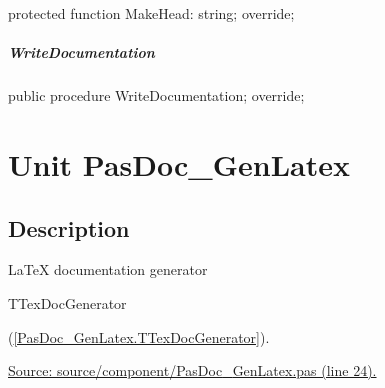 \documentclass{report}
\newif\ifpdf
\begin{document}
\label{PasDoc_GenHtmlHelp.THTMLHelpDocGenerator-MakeHead}
\begin{list}{}{
\setlength{\itemindent}{0cm}
\setlength{\listparindent}{0cm}
\setlength{\leftmargin}{\evensidemargin}
\addtolength{\leftmargin}{\tmplength}
\settowidth{\labelsep}{X}
\addtolength{\leftmargin}{\labelsep}
\setlength{\labelwidth}{\tmplength}
}
\item[\textbf{Declaration}\hfill]
\ifpdf
\begin{flushleft}
\fi
\begin{ttfamily}
protected function MakeHead: string; override;\end{ttfamily}

\ifpdf
\end{flushleft}
\fi

\end{list}
\paragraph*{WriteDocumentation}\hspace*{\fill}

\label{PasDoc_GenHtmlHelp.THTMLHelpDocGenerator-WriteDocumentation}
\begin{list}{}{
\setlength{\itemindent}{0cm}
\setlength{\listparindent}{0cm}
\setlength{\leftmargin}{\evensidemargin}
\addtolength{\leftmargin}{\tmplength}
\settowidth{\labelsep}{X}
\addtolength{\leftmargin}{\labelsep}
\setlength{\labelwidth}{\tmplength}
}
\item[\textbf{Declaration}\hfill]
\ifpdf
\begin{flushleft}
\fi
\begin{ttfamily}
public procedure WriteDocumentation; override;\end{ttfamily}

\ifpdf
\end{flushleft}
\fi

\end{list}
\chapter{Unit PasDoc{\_}GenLatex}
\label{PasDoc_GenLatex}
\section{Description}
LaTeX documentation generator \begin{ttfamily}TTexDocGenerator\end{ttfamily}(\ref{PasDoc_GenLatex.TTexDocGenerator}).\par
\href{https://github.com/pasdoc/pasdoc/blob/master/source/component/PasDoc_GenLatex.pas#L24}{Source: source/component/PasDoc{\_}GenLatex.pas (line 24).}
\end{document}
